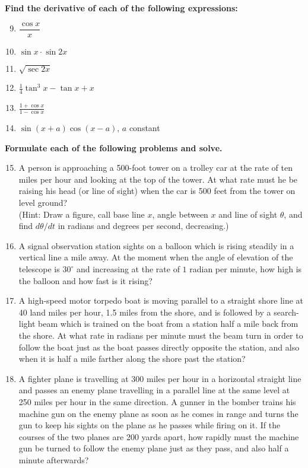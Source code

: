 \textbf{Find the derivative of each of the following expressions:}

\begin{enumerate}
    \setcounter{enumi}{8}
    \item $\dfrac{\cos x}{x}$
    \item $\sin x \cdot \sin 2x$
    \item $\sqrt{\sec 2x}$
    \item $\frac{1}{4} \tan^3 x - \tan x + x$
    \item $\frac{1 + \cos x}{1 - \cos x}$
    \item $\sin(x+a)\cos(x-a)$, $a$ constant
\end{enumerate}

\textbf{Formulate each of the following problems and solve.}

\begin{enumerate}
    \setcounter{enumi}{14}
    \item A person is approaching a 500-foot tower on a trolley car at the rate of ten miles per hour and looking at the top of the tower. At what rate must he be raising his head (or line of sight) when the car is 500 feet from the tower on level ground?\\
    (Hint: Draw a figure, call base line $x$, angle between $x$ and line of sight $\theta$, and find $d\theta/dt$ in radians and degrees per second, decreasing.)
    \item A signal observation station sights on a balloon which is rising steadily in a vertical line a mile away. At the moment when the angle of elevation of the telescope is $30^\circ$ and increasing at the rate of $1$ radian per minute, how high is the balloon and how fast is it rising?
    \item A high-speed motor torpedo boat is moving parallel to a straight shore line at 40 land miles per hour, 1.5 miles from the shore, and is followed by a search-light beam which is trained on the boat from a station half a mile back from the shore. At what rate in radians per minute must the beam turn in order to follow the boat just as the boat passes directly opposite the station, and also when it is half a mile farther along the shore past the station?
    \item A fighter plane is travelling at 300 miles per hour in a horizontal straight line and passes an enemy plane travelling in a parallel line at the same level at 250 miles per hour in the same direction. A gunner in the bomber trains his machine gun on the enemy plane as soon as he comes in range and turns the gun to keep his sights on the plane as he passes while firing on it. If the courses of the two planes are 200 yards apart, how rapidly must the machine gun be turned to follow the enemy plane just as they pass, and also half a minute afterwards?

\end{enumerate}
